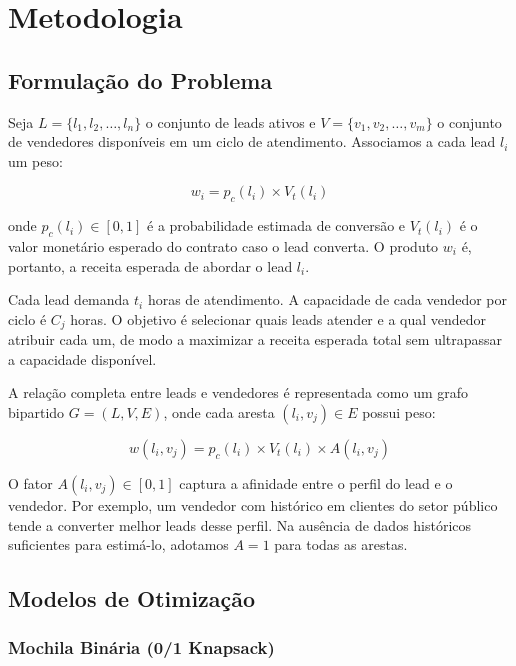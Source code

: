\documentclass[12pt,a4paper]{article}
\begin{document}
\section{Metodologia}

\subsection{Formula\c{c}\~{a}o do Problema}

Seja $L = \{l_1, l_2, \ldots, l_n\}$ o conjunto de leads ativos e
$V = \{v_1, v_2, \ldots, v_m\}$ o conjunto de vendedores dispon\'{i}veis em um
ciclo de atendimento. Associamos a cada lead $l_i$ um peso:

\begin{equation}
  w_i = p_c(l_i) \times V_t(l_i)
  \label{eq:peso}
\end{equation}

\noindent onde $p_c(l_i) \in [0,1]$ \'{e} a probabilidade estimada de convers\~{a}o e
$V_t(l_i)$ \'{e} o valor monet\'{a}rio esperado do contrato caso o lead converta. O
produto $w_i$ \'{e}, portanto, a receita esperada de abordar o lead $l_i$.

Cada lead demanda $t_i$ horas de atendimento. A capacidade de cada vendedor por
ciclo \'{e} $C_j$ horas. O objetivo \'{e} selecionar quais leads atender e a qual
vendedor atribuir cada um, de modo a maximizar a receita esperada total sem
ultrapassar a capacidade dispon\'{i}vel.

A rela\c{c}\~{a}o completa entre leads e vendedores \'{e} representada como um grafo
bipartido $G = (L, V, E)$, onde cada aresta $(l_i, v_j) \in E$ possui peso:

\begin{equation}
  w(l_i, v_j) = p_c(l_i) \times V_t(l_i) \times A(l_i, v_j)
  \label{eq:aresta}
\end{equation}

\noindent O fator $A(l_i, v_j) \in [0,1]$ captura a afinidade entre o perfil do
lead e o vendedor. Por exemplo, um vendedor com hist\'{o}rico em clientes do setor
p\'{u}blico tende a converter melhor leads desse perfil. Na aus\^{e}ncia de dados
hist\'{o}ricos suficientes para estim\'{a}-lo, adotamos $A = 1$ para todas as arestas.

\subsection{Modelos de Otimiza\c{c}\~{a}o}

\subsubsection{Mochila Bin\'{a}ria (0/1 Knapsack)}
\end{document}
